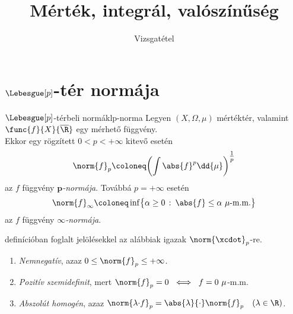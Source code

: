 \documentclass[
]{elteikthesis}[2024/04/26]
\title{Mérték, integrál, valószínűség} %
\subtitle{\circled{17} Vizsgatétel}
\begin{document}
	
	
	\section{\( \Lebesgue[p] \)-tér normája}
	
	\begin{definition}{\( \Lebesgue[p] \)-térbeli normák}{lp-norma}
		Legyen \( (X, \Omega, \mu) \) mértéktér, 
		valamint \( \func{f}{X}{\overline{\R}} \) egy mérhető függvény.\\[6pt]
		Ekkor egy rögzített \( 0 < p < +\infty \) kitevő esetén
		\[
			\norm{f}_p \coloneq
			\biggl( \int \abs{f}^p \dd{\mu} \biggr)^{\footnotesize \tfrac{1}{p}}
		\]
		az \( f \) függvény \emph{\( \boldsymbol{p} \)-normája}.
		Továbbá \( p = +\infty \) esetén
		\[
			\norm{f}_\infty \coloneq
			\inf \bigl\{ \alpha \geq 0 \ \colon \, \abs{f} \leq \alpha \ \mu \text{-m.m.} \bigr\}
		\]
		az \( f \) függvény \emph{\( \boldsymbol{\infty} \)-normája}.
	\end{definition}
	
	\begin{stat*}
		 definícióban foglalt jelölésekkel 
		az alábbiak igazak \( \norm{\xcdot}_p \)-re.
		\begin{enumerate}
			\item 
			\emph{Nemnegatív}, azaz
			\( 0 \leq \norm{f}_p \leq +\infty \).
			
			\item 
			\emph{Pozitív szemidefinit}, mert
			\( \norm{f}_p = 0 \ \iff \ f = 0 \ \mu \)-m.m.
			
			\item
			\emph{Abszolút homogén}, azaz
			\( \norm{\lambda {\cdot} f}_p = \abs{\lambda} {\cdot} \norm{f}_p \quad (\lambda \in \R) \).
		\end{enumerate}
	\end{stat*}
	
\end{document}

